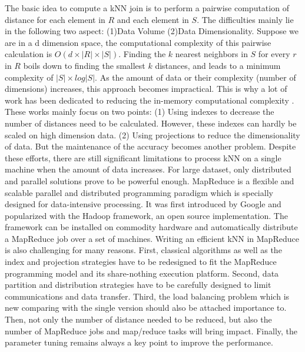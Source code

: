 \documentclass[10pt,journal,compsoc]{IEEEtran}
\begin{document}
The basic idea to compute a kNN join is to perform  a pairwise computation of distance for each element in $R$ and each 
element in $S$. The difficulties mainly lie in the following two aspect: (1)Data Volume (2)Data Dimensionality. 
Suppose we are in a d dimension space, the computational 
complexity of this pairwise calculation is $O(d \times \left|R\right| \times \left| S \right|)$. Finding the $k$ 
nearest neighbors in $S$ for every $r$ in $R$ 
boils down to finding the smallest $k$ distances, and leads to a minimum complexity of $\left| S \right| \times log 
\left| S \right|$. As the amount of data or their complexity (number of dimensions) increases, this approach becomes 
impractical. This is why a lot of work has been dedicated to reducing the in-memory 
computational 
complexity \cite{DBLP:journals/tods/JagadishOTYZ05_full,MuX_full,
Ciaccia:1997:MEA:645923.671005,DBLP:journals/geoinformatica/YuZHX10,
Bentley:1975:MBS:361002.361007}. These works mainly focus on two points: (1) Using indexes to decrease the number of 
distances need to be calculated. However, these indexes can hardly be scaled on high dimension data. (2) Using 
projections to reduce the dimensionality of data. But the maintenance of the accuracy becomes another problem. Despite 
these efforts, there are still significant limitations to process kNN on a single machine when the amount of data 
increases. For large dataset, only distributed and parallel solutions prove to be powerful enough. 
MapReduce is a flexible and scalable parallel and distributed programming paradigm which is specially designed for 
data-intensive processing. It was first 
introduced by Google \cite{Dean:2008:MSD:1327452.1327492} and popularized with the Hadoop framework, an open source 
implementation. 
The framework can be 
installed on commodity hardware and automatically distribute a MapReduce job over a set of machines. Writing an 
efficient kNN in MapReduce is also
challenging for many reasons. 
First, classical algorithms as well as the index and projection strategies have to be redesigned to fit the MapReduce 
programming model and its share-nothing execution platform. 
Second, data partition and distribution strategies have to be carefully designed to limit 
communications and data transfer. 
Third, the load balancing problem which is new comparing with the single version should also be attached importance to. 
Then, not only the number of distance needed to be reduced, but also the number of MapReduce jobs and map/reduce tasks 
will bring impact.
Finally, the parameter tuning remains always a key point to improve the performance.
\end{document}
